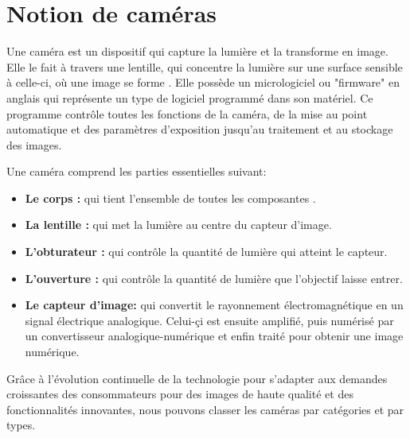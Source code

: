  \newpage
 
 
 \section{Notion de caméras}
 
 Une caméra est un dispositif qui capture la lumière et la transforme en image. Elle le fait à travers une lentille, qui concentre la lumière sur une surface sensible à celle-ci, où une image se forme \cite{noauthor_quest-ce_nodate}. Elle possède un micrologiciel ou "firmware" en anglais qui représente un type de logiciel programmé dans son matériel. Ce programme contrôle toutes les fonctions de la caméra, de la mise au point automatique et des paramètres d’exposition jusqu'au traitement et au stockage des images.
 
 Une caméra comprend les parties essentielles suivant: 
 \begin{itemize}
 	\item \textbf{Le corps :} qui tient l'ensemble de toutes les composantes . 
 	
 	\item \textbf{La lentille :} qui met la lumière au centre du capteur d’image. 
 	
 	\item \textbf{L’obturateur :} qui contrôle la quantité de lumière qui atteint le capteur.
 	
 	\item \textbf{L’ouverture :} qui contrôle la quantité de lumière que l’objectif laisse entrer.
 	
 	\item \textbf{Le capteur d'image:} qui convertit le rayonnement électromagnétique en un signal électrique analogique. Celui-çi est ensuite amplifié, puis numérisé par un convertisseur analogique-numérique et enfin traité pour obtenir une image numérique.  
 \end{itemize}
 
 Grâce à l'évolution continuelle de la technologie pour s'adapter aux demandes croissantes des consommateurs pour des images de haute qualité et des fonctionnalités innovantes, nous pouvons classer les caméras par catégories et par types.
 

